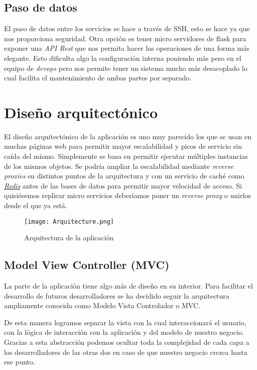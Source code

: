 \subsection{Paso de datos}

El paso de datos entre los servicios se hace a través de SSH, esto se hace ya que nos proporciona seguridad. Otra opción es tener micro servidores de flask para exponer una \emph{API Rest} que nos permita hacer las operaciones de una forma más elegante. Esto dificulta algo la configuración interna poniendo más peso en el equipo de \emph{devops} pero nos permite tener un sistema mucho más desacoplado lo cual facilita el mantenimiento de ambas partes por separado.


\section{Diseño arquitectónico}
El diseño arquitectónico de la aplicación es uno muy parecido los que se usan en muchas páginas web para permitir mayor escalabilidad y picos de servicio sin caída del mismo. Simplemente se basa en permitir ejecutar múltiples instancias de los mismos objetos. Se podría ampliar la escalabilidad mediante \emph{reverse proxies} en distintos puntos de la arquitectura y con un servicio de caché como \href{https://redis.io/}{\emph{Redis}} antes de las bases de datos para permitir mayor velocidad de acceso. Si quisiésemos replicar micro servicios deberíamos poner un \emph{reverse proxy} o unirlos desde el que ya está.


\begin{figure}
	\centering
	\texttt{[image: Arquitecture.png]}
	\caption{Arquitectura de la aplicación}\label{fig:Arquitecture.png}
\end{figure}

\subsection{Model View Controller (MVC)}

La parte de la aplicación tiene algo más de diseño en su interior. Para facilitar el desarrollo de futuros desarrolladores se ha decidido seguir la arquitectura ampliamente conocida como Modelo Vista Controlador o MVC. 

De esta manera logramos separar la vista con la cual interaccionará el usuario, con la lógica de interacción con la aplicación y del modelo de nuestro negocio. Gracias a esta abstracción podemos ocultar toda la complejidad de cada capa a los desarrolladores de las otras dos en caso de que nuestro negocio crezca hasta ese punto.

